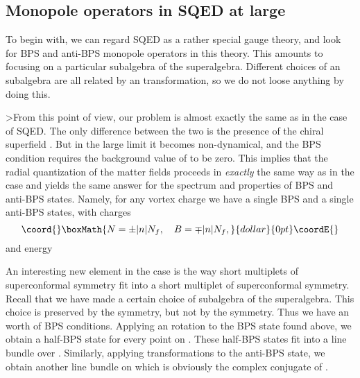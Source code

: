 \documentclass[a4paper,12pt, amsfonts, amssymb]{article}
\providecommand{\CC}{{\mathbb C}}
\providecommand{\PP}{{\mathbb P}}
\providecommand{\tQ}{{\tilde Q}}
\renewcommand{\L}{{\mathcal L}}
\begin{document}
\subsection{Monopole operators in \coordHE{} SQED at large \coordHE{}}

To begin with, we can regard \coordHE{} SQED as a rather special \coordHE{} gauge
theory, and look for BPS and anti-BPS monopole operators in this theory.
This amounts to focusing on a particular \coordHE{} subalgebra of the
\coordHE{} superalgebra. Different choices of an \coordHE{} subalgebra are all related
by an \coordHE{} transformation, so we do not loose anything by doing this.

>From this point of view, our problem is almost exactly the same as in the
case of \coordHE{} SQED. The only difference between the two is the presence
of the chiral superfield \myHighlight{$\Phi$}\coordHE{}. But in the large \coordHE{} limit it becomes
non-dynamical, and the \coordHE{}  BPS condition requires the background value of
\myHighlight{$\Phi$}\coordHE{} to be zero. This implies that the radial quantization of the matter
fields \myHighlight{$Q_j,\tQ_j$}\coordHE{} proceeds in {\it exactly} the same way as in the
\coordHE{} case and yields the same answer for the spectrum and properties
of BPS and anti-BPS states. Namely, for any vortex charge \coordHE{} we have a 
single BPS and a single anti-BPS states, with charges
$$\coord{}\boxMath{
N=\pm |n| N_f,\quad B=\mp |n|N_f,
}{dollar}{0pt}\coordE{}$$
and energy \coordHE{}

An interesting new element in the \coordHE{} case is the way short
multiplets of \coordHE{} superconformal symmetry fit into a short multiplet
of \coordHE{} superconformal symmetry. Recall that we have made a certain
choice of \coordHE{} subalgebra of the \coordHE{} superalgebra. 
This choice is preserved by the \coordHE{} symmetry, but not by the 
\coordHE{} symmetry. Thus we have an \myHighlight{$SU(2)/U(1)\simeq \CC\PP^1$}\coordHE{} worth of BPS conditions. Applying an \coordHE{} rotation to the BPS state found above, we obtain a half-BPS state for every point on \myHighlight{$\CC\PP^1$}\coordHE{}. These half-BPS states
fit into a line bundle \myHighlight{$\L$}\coordHE{} over \myHighlight{$\CC\PP^1$}\coordHE{}. Similarly, applying \coordHE{}
transformations to the anti-BPS state, we obtain another line bundle
on \myHighlight{$\CC\PP^1$}\coordHE{} which is obviously the complex conjugate of \myHighlight{$\L$}\coordHE{}.
\end{document}
